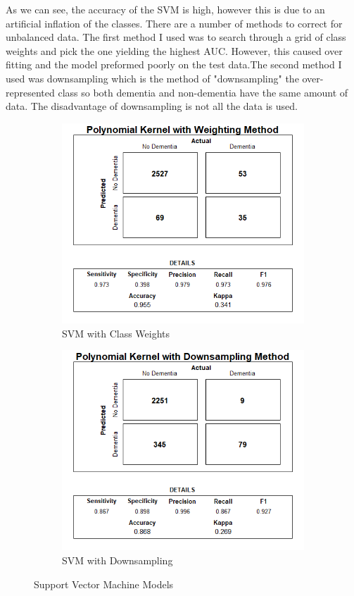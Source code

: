 \documentclass[a4paper,man,natbib,11pt]{article}
\begin{document}
As we can see, the accuracy of the SVM is high, however this is due to an artificial inflation of the classes. There are a number of methods to correct for unbalanced data. The first method I used was to search through a grid of class weights and pick the one yielding the highest AUC. However, this caused over fitting and the model preformed poorly on the test data.The second method I used was downsampling which is the method of "downsampling" the over-represented class so both dementia and non-dementia have the same amount of data. The disadvantage of downsampling is not all the data is used. 

\begin{figure}[h!]
\centering
\begin{subfigure}{.5\textwidth}
  \centering
  \includegraphics[width=\linewidth]{poly_weighted.png}
  \caption{SVM with Class Weights}
  \label{fig:sub1}
\end{subfigure}%
\begin{subfigure}{.5\textwidth}
  \centering
  \includegraphics[width=\linewidth]{final_poly.png}
  \caption{SVM with Downsampling}
  \label{fig:sub2}
\end{subfigure}
\caption{Support Vector Machine Models}
\label{fig:test}
\end{figure}
\end{document}
